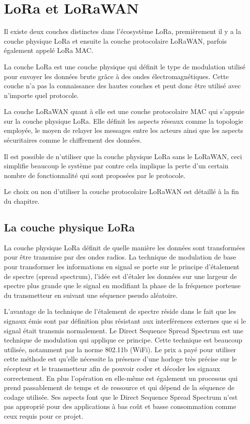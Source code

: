 \chapter{LoRa et LoRaWAN}

Il existe deux couches distinctes dans l’écosystème LoRa, premièrement il y a la couche physique LoRa et ensuite la couche protocolaire LoRaWAN, parfois également appelé LoRa MAC.

La couche LoRa est une couche physique qui définit le type de modulation utilisé pour envoyer les données brute grâce à des ondes électromagnétiques. Cette couche n’a pas la connaissance des hautes couches et peut donc être utilisé avec n’importe quel protocole.

La couche LoRaWAN quant à elle est une couche protocolaire MAC qui s’appuie sur la couche physique LoRa. Elle définit les aspects réseaux comme la topologie employée, le moyen de relayer les messages entre les acteurs ainsi que les aspects sécuritaires comme le chiffrement des données.

Il est possible de n’utiliser que la couche physique LoRa sans le LoRaWAN, ceci simplifie beaucoup le système par contre cela implique la perte d’un certain nombre de fonctionnalité qui sont proposées par le protocole.

Le choix ou non d’utiliser la couche protocolaire LoRaWAN est détaillé à la fin du chapitre.

\section{La couche physique LoRa}

La couche physique LoRa définit de quelle manière les données sont transformées pour être transmise par des ondes radios. La technique de modulation de base pour transformer les informations en signal se porte sur le principe d’étalement de spectre (spread spectrum), l’idée est d’étaler les données sur une largeur de spectre plus grande que le signal en modifiant la phase de la fréquence porteuse du transmetteur en suivant une séquence pseudo aléatoire.

L’avantage de la technique de l’étalement de spectre réside dans le fait que les signaux émis sont par définition plus résistant aux interférences externes que si le signal était transmis normalement. Le Direct Sequence Spread Spectrum est une technique de modulation qui applique ce principe. Cette technique est beaucoup utilisée, notamment par la norme 802.11b (WiFi). Le prix a payé pour utiliser cette méthode est qu’elle nécessite la présence d’une horloge très précise sur le récepteur et le transmetteur afin de pouvoir coder et décoder les signaux correctement. En plus l’opération en elle-même est également un processus qui prend passablement de temps et de ressource et qui dépend de la séquence de codage utilisée. Ses aspects font que le Direct Sequence Spread Spectrum n’est pas approprié pour des applications à bas coût et basse consommation comme ceux requis pour ce projet.

